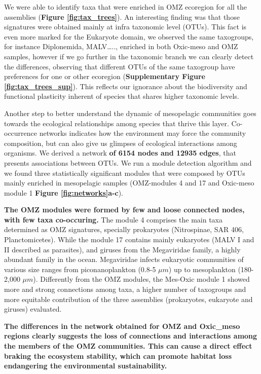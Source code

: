 \documentclass[fleqn,10pt]{wlscirep}
\begin{document}
We were able to identify taxa that were enriched in OMZ ecoregion for all the assemblies (\textbf{Figure \ref{fig:tax_trees}}). An interesting finding was that those signatures were obtained mainly at infra taxonomic level (OTUs). This fact is even more marked for the Eukaryote domain, we observed the same taxogroups, for instance Diplonemida, MALV….., enriched in both Oxic-meso and OMZ samples, however if we go further in the taxonomic branch we can clearly detect the differences, observing that different OTUs of the same taxogroup have preferences for one or other ecoregion (\textbf{Supplementary Figure \ref{fig:tax_trees_sup}}). This reflects our ignorance about the biodiversity and functional plasticity inherent of species that shares higher taxonomic levels.

Another step to better understand the dynamic of mesopelagic communities goes towards the ecological relationships among species that thrive this layer. Co-occurrence networks indicates how the environment may force the community composition, but can also give us glimpses of ecological interactions among organisms. We derived a network \textbf{of 6154 nodes and 12935 edges}, that presents associations between OTUs. We run a module detection algorithm and we found three statistically significant modules that were composed by OTUs mainly enriched in mesopelagic samples (OMZ-modules 4 and 17 and Oxic-meso module 1 \textbf{Figure \ref{fig:networks}a-c}).

\textbf{The OMZ modules were formed by few and loose connected nodes, with few taxa co-occuring.} The module 4 comprises the main taxa determined as OMZ signatures, specially prokaryotes (Nitrospinae, SAR 406, Planctomicetes). While the module 17 contains mainly eukaryotes (MALV I and II described as parasites), and giruses from the Megaviridae family, a highly abundant family in the ocean. Megaviridae infects eukaryotic communities of various size ranges from piconanoplankton (0.8-5 $\mu m$) up to mesoplankton (180-2,000 $\mu m$). Differently from the OMZ modules, the Mes-Oxic module 1 showed more and strong connections among taxa, a higher number of taxogroups and more equitable contribution of the three assemblies (prokaryotes, eukaryote and giruses) evaluated.

\textbf{The differences in the network obtained for OMZ and Oxic\_meso regions clearly suggests the loss of connections and interactions among the members of the OMZ communities. This can cause a direct effect braking the ecosystem stability, which can promote habitat loss endangering the environmental sustainability.}
\end{document}
